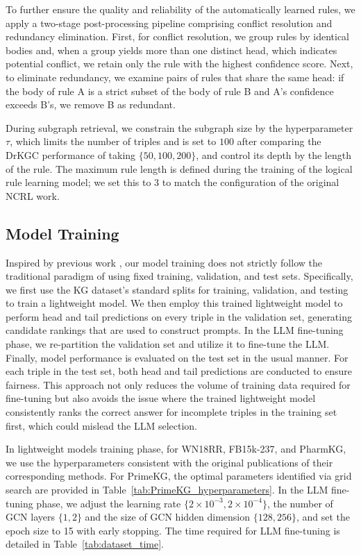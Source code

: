 \documentclass[11pt]{article}
\begin{document}
To further ensure the quality and reliability of the automatically learned rules, we apply a two-stage post-processing pipeline comprising conflict resolution and redundancy elimination. First, for conflict resolution, we group rules by identical bodies and, when a group yields more than one distinct head, which indicates potential conflict, we retain only the rule with the highest confidence score. Next, to eliminate redundancy, we examine pairs of rules that share the same head: if the body of rule A is a strict subset of the body of rule B and A’s confidence exceeds B’s, we remove B as redundant.

During subgraph retrieval, we constrain the subgraph size by the hyperparameter $\tau$, which limits the number of triples and is set to $100$ after comparing the DrKGC performance of taking $\{50, 100, 200\}$, and control its depth by the length of the rule. The maximum rule length is defined during the training of the logical rule learning model; we set this to 3 to match the configuration of the original NCRL work.


\subsection{Model Training}\label{app:training}
Inspired by previous work \cite{wei2024kicgpt,liu2024finetuninggenerativelargelanguage}, our model training does not strictly follow the traditional paradigm of using fixed training, validation, and test sets. Specifically, we first use the KG dataset’s standard splits for training, validation, and testing to train a lightweight model. We then employ this trained lightweight model to perform head and tail predictions on every triple in the validation set, generating candidate rankings that are used to construct prompts. In the LLM fine-tuning phase, we re-partition the validation set \cite{liu2024finetuninggenerativelargelanguage} and utilize it to fine-tune the LLM. Finally, model performance is evaluated on the test set in the usual manner. For each triple in the test set, both head and tail predictions are conducted to ensure fairness. This approach not only reduces the volume of training data required for fine-tuning but also avoids the issue where the trained lightweight model consistently ranks the correct answer for incomplete triples in the training set first, which could mislead the LLM selection.

In lightweight models training phase, for WN18RR, FB15k-237, and PharmKG, we use the hyperparameters consistent with the original publications of their corresponding methods. For PrimeKG, the optimal parameters identified via grid search are provided in Table~\ref{tab:PrimeKG_hyperparameters}. In the LLM fine-tuning phase, we adjust the learning rate $\{2 \times 10^{-3}, 2 \times 10^{-4}\}$, the number of GCN layers $\{1,2\}$ and the size of GCN hidden dimension $\{128, 256\}$, and set the epoch size to 15 with early stopping. The time required for LLM fine-tuning is detailed in Table~\ref{tab:dataset_time}.
\end{document}
